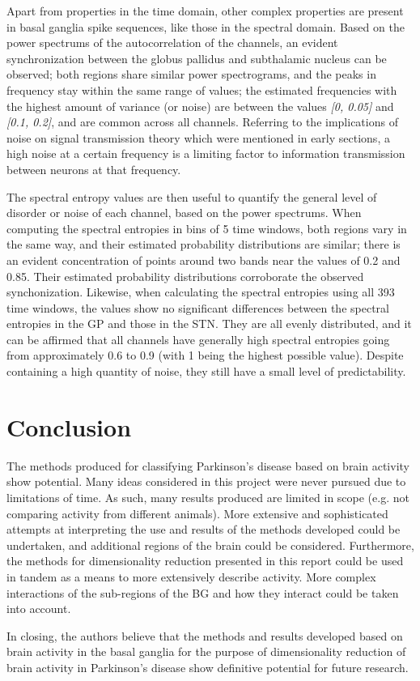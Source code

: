 \documentclass{kththesis}
\begin{document}
Apart from properties in the time domain, other complex properties are present in basal ganglia spike sequences, like those in the spectral domain. 
Based on the power spectrums of the autocorrelation of the channels, an evident synchronization between the globus pallidus and subthalamic nucleus can be observed; both regions share similar power spectrograms, and the peaks in frequency stay within the same range of values; the estimated frequencies with the highest amount of variance (or noise) are between the values \textit{[0, 0.05]} and \textit{[0.1, 0.2]}, and are common across all channels. 
Referring to the implications of noise on signal transmission theory which were mentioned in early sections, a high noise at a certain frequency is a limiting factor to information transmission between neurons at that frequency. 

The spectral entropy values are then useful to quantify the general level of disorder or noise of each channel, based on the power spectrums. 
When computing the spectral entropies in bins of 5 time windows, both regions vary in the same way, and their estimated probability distributions are similar; there is an evident concentration of points around two bands near the values of 0.2 and 0.85.
Their estimated probability distributions corroborate the observed synchonization. 
Likewise, when calculating the spectral entropies using all 393 time windows, the values show no significant differences between the spectral entropies in the GP and those in the STN. 
They are all evenly distributed, and it can be affirmed that all channels have generally high spectral entropies going from approximately 0.6 to 0.9 (with 1 being the highest possible value). 
Despite containing a high quantity of noise, they still have a small level of predictability. 


\newpage
\chapter{Conclusion}

The methods produced for classifying Parkinson's disease based on brain activity show potential.
Many ideas considered in this project were never pursued due to limitations of time. 
As such, many results produced are limited in scope (e.g. not comparing activity from different animals).
More extensive and sophisticated attempts at interpreting the use and results of the methods developed could be undertaken, and additional regions of the brain could be considered.
Furthermore, the methods for dimensionality reduction presented in this report could be used in tandem as a means to more extensively describe activity.
More complex interactions of the sub-regions of the BG and how they interact could be taken into account.

In closing, the authors believe that the methods and results developed based on brain activity in the basal ganglia for the purpose of dimensionality reduction of brain activity in Parkinson's disease show definitive potential for future research.

\newpage
\printbibliography[heading=bibintoc]
\end{document}
